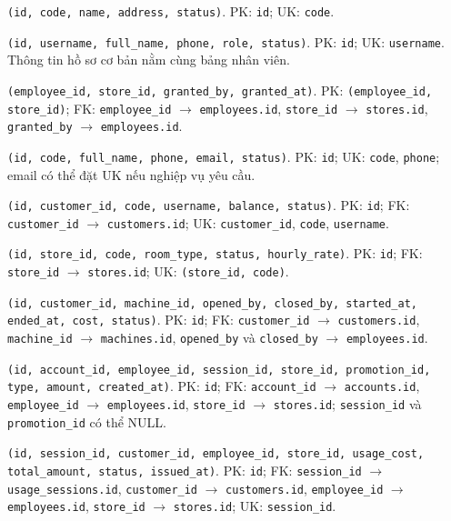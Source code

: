 \begin{description}[leftmargin=4.2cm,labelwidth=4.0cm,style=nextline]
  \item[\texttt{stores}] \texttt{(id, code, name, address, status)}. PK: \texttt{id}; UK: \texttt{code}.
  \item[\texttt{employees}] \texttt{(id, username, full\_name, phone, role, status)}. PK: \texttt{id}; UK: \texttt{username}. Thông tin hồ sơ cơ bản nằm cùng bảng nhân viên.
  \item[\texttt{employee\_store\_assignments}] \texttt{(employee\_id, store\_id, granted\_by, granted\_at)}. PK: \texttt{(employee\_id, store\_id)}; FK: \texttt{employee\_id} $\rightarrow$ \texttt{employees.id}, \texttt{store\_id} $\rightarrow$ \texttt{stores.id}, \texttt{granted\_by} $\rightarrow$ \texttt{employees.id}.
  \item[\texttt{customers}] \texttt{(id, code, full\_name, phone, email, status)}. PK: \texttt{id}; UK: \texttt{code}, \texttt{phone}; email có thể đặt UK nếu nghiệp vụ yêu cầu.
  \item[\texttt{accounts}] \texttt{(id, customer\_id, code, username, balance, status)}. PK: \texttt{id}; FK: \texttt{customer\_id} $\rightarrow$ \texttt{customers.id}; UK: \texttt{customer\_id}, \texttt{code}, \texttt{username}.
  \item[\texttt{machines}] \texttt{(id, store\_id, code, room\_type, status, hourly\_rate)}. PK: \texttt{id}; FK: \texttt{store\_id} $\rightarrow$ \texttt{stores.id}; UK: \texttt{(store\_id, code)}.
  \item[\texttt{usage\_sessions}] \texttt{(id, customer\_id, machine\_id, opened\_by, closed\_by, started\_at, ended\_at, cost, status)}. PK: \texttt{id}; FK: \texttt{customer\_id} $\rightarrow$ \texttt{customers.id}, \texttt{machine\_id} $\rightarrow$ \texttt{machines.id}, \texttt{opened\_by} và \texttt{closed\_by} $\rightarrow$ \texttt{employees.id}.
  \item[\texttt{account\_transactions}] \texttt{(id, account\_id, employee\_id, session\_id, store\_id, promotion\_id, type, amount, created\_at)}. PK: \texttt{id}; FK: \texttt{account\_id} $\rightarrow$ \texttt{accounts.id}, \texttt{employee\_id} $\rightarrow$ \texttt{employees.id}, \texttt{store\_id} $\rightarrow$ \texttt{stores.id}; \texttt{session\_id} và \texttt{promotion\_id} có thể NULL.
  \item[\texttt{invoices}] \texttt{(id, session\_id, customer\_id, employee\_id, store\_id, usage\_cost, total\_amount, status, issued\_at)}. PK: \texttt{id}; FK: \texttt{session\_id} $\rightarrow$ \texttt{usage\_sessions.id}, \texttt{customer\_id} $\rightarrow$ \texttt{customers.id}, \texttt{employee\_id} $\rightarrow$ \texttt{employees.id}, \texttt{store\_id} $\rightarrow$ \texttt{stores.id}; UK: \texttt{session\_id}.

\end{description}
